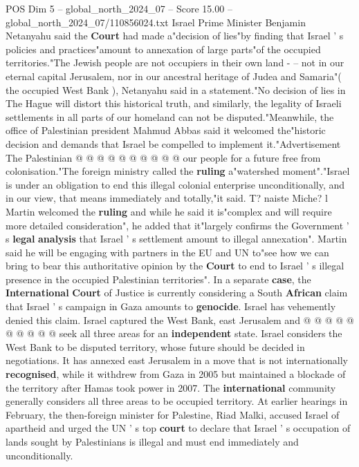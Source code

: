 \begin{textsample}{POS Dim 5 – global\_north\_2024\_07 – Score 15.00 – global\_north\_2024\_07/110856024.txt}
Israel Prime Minister Benjamin Netanyahu said the \textbf{Court} had made a"decision of lies"by finding that Israel ' s policies and practices"amount to annexation of large parts"of the occupied territories."The Jewish people are not occupiers in their own land - -- not in our eternal capital Jerusalem, nor in our ancestral heritage of Judea and Samaria"( the occupied West Bank ), Netanyahu said in a statement."No decision of lies in The Hague will distort this historical truth, and similarly, the legality of Israeli settlements in all parts of our homeland can not be disputed."Meanwhile, the office of Palestinian president Mahmud Abbas said it welcomed the"historic decision and demands that Israel be compelled to implement it."Advertisement The Palestinian @ @ @ @ @ @ @ @ @ @ our people for a future free from colonisation."The foreign ministry called the \textbf{ruling} a"watershed moment"."Israel is under an obligation to end this illegal colonial enterprise unconditionally, and in our view, that means immediately and totally,"it said.
T? naiste Miche? l Martin welcomed the \textbf{ruling} and while he said it is"complex and will require more detailed consideration", he added that it"largely confirms the Government ' s \textbf{legal} \textbf{analysis} that Israel ' s settlement amount to illegal annexation".
Martin said he will be engaging with partners in the EU and UN to"see how we can bring to bear this authoritative opinion by the \textbf{Court} to end to Israel ' s illegal presence in the occupied Palestinian territories".
In a separate \textbf{case}, the \textbf{International} \textbf{Court} of Justice is currently considering a South \textbf{African} claim that Israel ' s campaign in Gaza amounts to \textbf{genocide}.
Israel has vehemently denied this claim.
Israel captured the West Bank, east Jerusalem and @ @ @ @ @ @ @ @ @ @ seek all three areas for an \textbf{independent} state.
Israel considers the West Bank to be disputed territory, whose future should be decided in negotiations.
It has annexed east Jerusalem in a move that is not internationally \textbf{recognised}, while it withdrew from Gaza in 2005 but maintained a blockade of the territory after Hamas took power in 2007.
The \textbf{international} community generally considers all three areas to be occupied territory.
At earlier hearings in February, the then-foreign minister for Palestine, Riad Malki, accused Israel of apartheid and urged the UN ' s top \textbf{court} to declare that Israel ' s occupation of lands sought by Palestinians is illegal and must end immediately and unconditionally.

\end{textsample}
